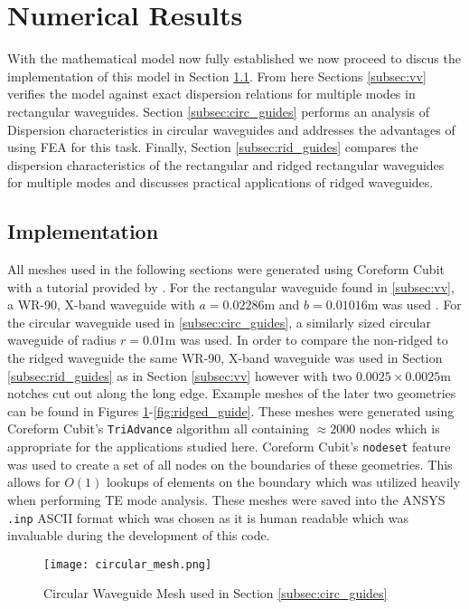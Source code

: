 \section{Numerical Results}
\label{sec:numres}
With the mathematical model now fully established we now proceed to discus the implementation of this model in Section \ref{subsec:impl}. From here Sections \ref{subsec:vv} verifies the model against exact dispersion relations for multiple modes in rectangular waveguides. Section \ref{subsec:circ_guides} performs an analysis of Dispersion characteristics in circular waveguides and addresses the advantages of using FEA for this task. Finally, Section \ref{subsec:rid_guides} compares the dispersion characteristics of the rectangular and ridged rectangular waveguides for multiple modes and discusses practical applications of ridged waveguides.

\subsection{Implementation}
\label{subsec:impl}
All meshes used in the following sections were generated using Coreform Cubit \cite{cubit} with a tutorial provided by \cite{rothlecnotes}. For the rectangular waveguide found in \ref{subsec:vv}, a WR-90, X-band waveguide with $a=0.02286$m and $b=0.01016$m was used \cite{everythingrf}. For the circular waveguide used in \ref{subsec:circ_guides}, a similarly sized circular waveguide of radius $r=0.01$m was used. In order to compare the non-ridged to the ridged waveguide the same WR-90, X-band waveguide was used in Section \ref{subsec:rid_guides} as in Section \ref{subsec:vv} however with two $0.0025\times0.0025$m notches cut out along the long edge. Example meshes of the later two geometries can be found in Figures \ref{fig:circular_guide}-\ref{fig:ridged_guide}. These meshes were generated using Coreform Cubit's \verb|TriAdvance| algorithm all containing $\approx2000$ nodes which is appropriate for the applications studied here. Coreform Cubit's \verb|nodeset| feature was used to create a set of all nodes on the boundaries of these geometries. This allows for $O(1)$ lookups of elements on the boundary which was utilized heavily when performing TE mode analysis. These meshes were saved into the ANSYS \verb|.inp| ASCII format which was chosen as it is human readable which was invaluable during the development of this code.

\begin{figure}[h!]  
	\centering
	\texttt{[image: circular\_mesh.png]} 
	\caption{Circular Waveguide Mesh used in Section \ref{subsec:circ_guides}}
	\label{fig:circular_guide}
\end{figure}

